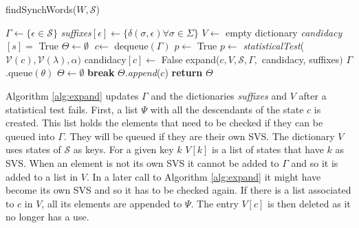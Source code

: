 {\begin{algorithm} 
  \caption{findSynchWords($W, \mathcal{S}$)\label{alg:findsynchwords}}
    \begin{algorithmic}[1]
      	\State $\Gamma \gets \{\epsilon \in \mathcal{S}\}$ 
        \State \textit{suffixes}$[\epsilon ] \gets \{\delta (\sigma , \epsilon) \forall \sigma \in \Sigma \}$
        \State $V \gets$ empty dictionary
        	\State \textit{candidacy}$[s] = $ True
        \EndFor
        \State $\Theta \gets \emptyset$ 
      \EndProcedure	
      	\While{$\Gamma \neq \emptyset$}
        	\State $\textit{c} \leftarrow$ dequeue$(\Gamma)$
        		\State $p \leftarrow$ True
        		\If {$\Lambda \neq \emptyset$}
        				\State $p \leftarrow$ \textit{statisticalTest}($\mathcal{V}(c), \mathcal{V}(\lambda), \alpha)$
        					\State candidacy$[c] \gets$ False
        					\State expand($c, V, \mathcal{S}, \Gamma,$ candidacy, suffixes$)$
        						\State $\Gamma$.queue$(\theta)$
        					\EndFor
        					\State $\Theta \leftarrow \emptyset$
        					\State \textbf{break}
        				\EndIf
        			\EndFor
        		\EndIf
        			\State $\Theta$.\textit{append}($c$)
        		\EndIf
        	\EndIf
      	\EndWhile
      	\State \textbf{return} $\Theta$
      \EndProcedure
    \end{algorithmic}
  \end{algorithm}
  
Algorithm \ref{alg:expand} updates $\Gamma$ and the dictionaries \textit{suffixes} and $V$ after a statistical test fails. First, a list $\Psi$ with all the descendants of the state $c$ is created. This list holds the elements that need to be checked if they can be queued into $\Gamma$. They will be queued if they are their own SVS.  The dictionary $V$ uses states of $\mathcal{S}$ as keys. For a given key $k$ $V[k]$ is a list of states that have $k$ as SVS. When an element is not its own SVS it cannot be added to $\Gamma$ and so it is added to a list in $V$. In a later call to Algorithm \ref{alg:expand} it might have become its own SVS and so it has to be checked again. If there is a list associated to $c$ in $V$, all its elements are appended to $\Psi$. The entry $V[c]$ is then deleted as it no longer has a use.

}
